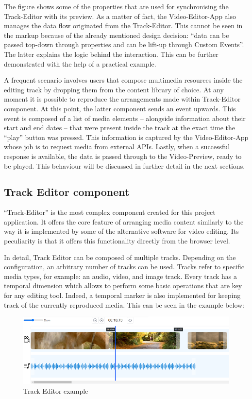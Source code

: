 The figure shows some of the properties that are used for synchronising the Track-Editor with its preview. As a matter of fact, the Video-Editor-App also manages the data flow originated from the Track-Editor. This cannot be seen in the markup because of the already mentioned design decision: “data can be passed top-down through properties and can be lift-up through Custom Events”. The latter explains the logic behind the interaction. This can be further demonstrated with the help of a practical example.

A frequent scenario involves users that compose multimedia resources inside the editing track by dropping them from the content library of choice. At any moment it is possible to reproduce the arrangements made within Track-Editor component. At this point, the latter component sends an event upwards. This event is composed of a list of media elements – alongside information about their start and end dates – that were present inside the track at the exact time the “play” button was pressed. This information is captured by the Video-Editor-App whose job is to request media from external APIs. Lastly, when a successful response is available, the data is passed through to the Video-Preview, ready to be played. This behaviour will be discussed in further detail in the next sections.

\subsection{Track Editor component}
\label{subsec:trackEditpr}

“Track-Editor” is the most complex component created for this project application. It offers the core feature of arranging media content similarly to the way it is implemented by some of the alternative software for video editing. Its peculiarity is that it offers this functionality directly from the browser level.

In detail, Track Editor can be composed of multiple tracks. Depending on the configuration, an arbitrary number of tracks can be used. Tracks refer to specific media types, for example: an audio, video, and image track. Every track has a temporal dimension which allows to perform some basic operations that are key for any editing tool. Indeed, a temporal marker is also implemented for keeping track of the currently reproduced media. This can be seen in the example below:

\begin{figure}[H]
\centering
\includegraphics[width=1\textwidth]{images/TrackEditor.png}
\caption{Track Editor example}
\label{fig:trackEditor}
\end{figure}

